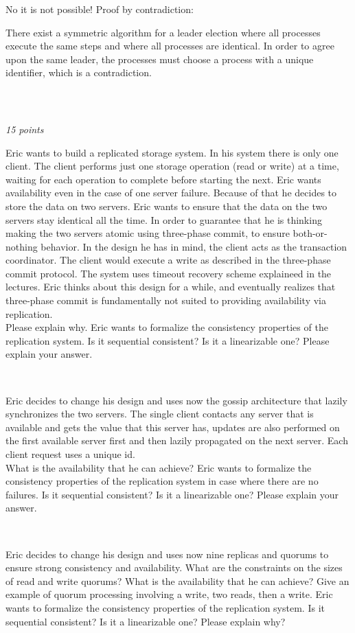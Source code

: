 \documentclass[a4paper]{article}
\newcommand{\points}[1]{\subsection{} \textit{#1 points}\\}
\newcommand{\question}[2][]{
  \parbox[t]{\textwidth}{
    \ifthenelse{\equal{#1}{}}{}{#1)}
    \parbox[t]{0.95\textwidth}{#2}}\\}
\newcommand{\solution}[2][]{
  \ifthenelse{\equal{#1}{} \or \equal{#1}{a}}{\\[3pt]\textit{Solution: }\\[0.1cm]}{}
  \parbox[t]{\textwidth}{
    \ifthenelse{\equal{#1}{}}{}{#1)}
    \parbox[t]{0.95\textwidth}{#2}}\\
}
\begin{document}
\solution[c]{
  No it is not possible! Proof by contradiction:

  There exist a symmetric algorithm for a leader election where all
  processes execute the same steps and where all processes are
  identical. In order to agree upon the same leader, the processes must
  choose a process with a unique identifier, which is a contradiction.
}
\points{15}
\question[a]{
  Eric wants to build a replicated storage system. In his
  system there is only one client. The client performs just one
  storage operation (read or write) at a time, waiting for each
  operation to complete before starting the next. Eric wants
  availability even in the case of one server failure. Because of that
  he decides to store the data on two servers. Eric wants to ensure
  that the data on the two servers stay identical all the time. In
  order to guarantee that he is thinking making the two servers atomic
  using three-phase commit, to ensure both-or-nothing behavior. In the
  design he has in mind, the client acts as the transaction
  coordinator. The client would execute a write as described in the
  three-phase commit protocol. The system uses timeout recovery scheme
  explaineed in the lectures. Eric thinks about this design for a
  while, and eventually realizes that three-phase commit is
  fundamentally not suited to providing availability via
  replication. \\
  Please explain why. Eric wants to formalize the consistency
  properties of the replication system. Is it sequential consistent?
  Is it a linearizable one? Please explain your answer.
}
\question[b]{
  Eric decides to change his design and uses now the gossip
  architecture that lazily synchronizes the two servers. The single
  client contacts any server that is available and gets the value that
  this server has, updates are also performed on the first available
  server first and then lazily propagated on the next server. Each
  client request uses a unique id.\\
  What is the availability that he can achieve? Eric wants to
  formalize the consistency properties of the replication system in
  case where there are no failures. Is it sequential consistent? Is it
  a linearizable one? Please explain your answer.
}
\question[c]{
  Eric decides to change his design and uses now nine replicas
  and quorums to ensure strong consistency and availability. What are
  the constraints on the sizes of read and write quorums? What is the
  availability that he can achieve? Give an example of quorum
  processing involving a write, two reads, then a write. Eric wants
  to formalize the consistency properties of the replication
  system. Is it sequential consistent? Is it a linearizable one?
  Please explain why?
}
\end{document}
